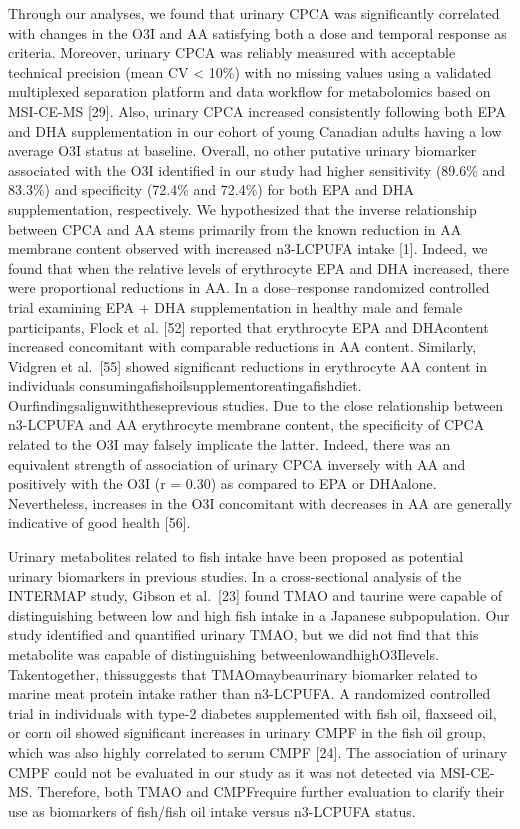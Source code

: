 \documentclass[journal=jacsat,manuscript=article]{achemso}
\begin{document}
Through our analyses, we found that urinary CPCA was significantly
correlated with changes in the O3I and AA satisfying both a dose and
temporal response as criteria. Moreover, urinary CPCA was reliably
measured with acceptable technical precision (mean CV \textless{} 10\%)
with no missing values using a validated multiplexed separation platform
and data workflow for metabolomics based on MSI-CE-MS {[}29{]}. Also,
urinary CPCA increased consistently following both EPA and DHA
supplementation in our cohort of young Canadian adults having a low
average O3I status at baseline. Overall, no other putative urinary
biomarker associated with the O3I identified in our study had higher
sensitivity (89.6\% and 83.3\%) and specificity (72.4\% and 72.4\%) for
both EPA and DHA supplementation, respectively. We hypothesized that the
inverse relationship between CPCA and AA stems primarily from the known
reduction in AA membrane content observed with increased n3-LCPUFA
intake {[}1{]}. Indeed, we found that when the relative levels of
erythrocyte EPA and DHA increased, there were proportional reductions in
AA. In a dose--response randomized controlled trial examining EPA + DHA
supplementation in healthy male and female participants, Flock et al.
{[}52{]} reported that erythrocyte EPA and DHAcontent increased
concomitant with comparable reductions in AA content. Similarly, Vidgren
et al.~{[}55{]} showed significant reductions in erythrocyte AA content
in individuals consumingafishoilsupplementoreatingafishdiet.
Ourfindingsalignwiththeseprevious studies. Due to the close relationship
between n3-LCPUFA and AA erythrocyte membrane content, the specificity
of CPCA related to the O3I may falsely implicate the latter. Indeed,
there was an equivalent strength of association of urinary CPCA
inversely with AA and positively with the O3I (r = 0.30) as compared to
EPA or DHAalone. Nevertheless, increases in the O3I concomitant with
decreases in AA are generally indicative of good health {[}56{]}.

Urinary metabolites related to fish intake have been proposed as
potential urinary biomarkers in previous studies. In a cross-sectional
analysis of the INTERMAP study, Gibson et al.~{[}23{]} found TMAO and
taurine were capable of distinguishing between low and high fish intake
in a Japanese subpopulation. Our study identified and quantified urinary
TMAO, but we did not find that this metabolite was capable of
distinguishing betweenlowandhighO3Ilevels. Takentogether, thissuggests
that TMAOmaybeaurinary biomarker related to marine meat protein intake
rather than n3-LCPUFA. A randomized controlled trial in individuals with
type-2 diabetes supplemented with fish oil, flaxseed oil, or corn oil
showed significant increases in urinary CMPF in the fish oil group,
which was also highly correlated to serum CMPF {[}24{]}. The association
of urinary CMPF could not be evaluated in our study as it was not
detected via MSI-CE-MS. Therefore, both TMAO and CMPFrequire further
evaluation to clarify their use as biomarkers of fish/fish oil intake
versus n3-LCPUFA status.
\end{document}
